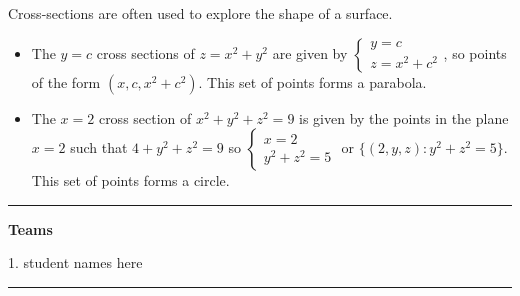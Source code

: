 \documentclass[12pt,letterpaper,noanswers]{exam}
\begin{document}
Cross-sections are often used to explore the shape of a surface.
\begin{itemize}
    \item The $y = c$ cross sections of $z = x^2 + y^2$ are given by $\left\{\begin{array}{c} y = c \\ z = x^2 + c^2\end{array}\right.$, so points of the form $(x,c,x^2+c^2)$.  This set of points forms a parabola.
    \item The $x = 2$ cross section of $x^2+y^2+z^2 = 9$ is given by the points in the plane $x=2$ such that $4+y^2+z^2 = 9$ so $\left\{\begin{array}{c} x=2 \\ y^2+z^2 = 5\end{array}\right.$ or $\{(2,y,z): y^2+z^2=5\}$.  This set of points forms a circle.
\end{itemize}
\vspace{0.2cm}
\hrule
\vspace{0.2cm}
\noindent\textbf{Teams}
\begin{multicols}{3}
1.  student names here
\end{multicols}

\vspace{0.2cm}
\hrule
\vspace{0.2cm}
\end{document}
